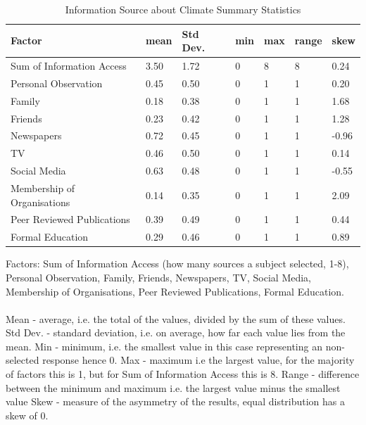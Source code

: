 \begin{center}
\begin{table}[H]
    \centering
    \begin{tabular}{|l|l|l|l|l|l|l|}
    \hline
        \textbf{Factor} & \textbf{mean} & \textbf{Std Dev}. & \textbf{ min} & \textbf{max} & \textbf{ range} & \textbf{skew}  \\ \hline
        
      Sum of Information Access & 3.50 & 1.72 & 0 & 8 & 8 & 0.24 \\ \hline
        Personal Observation  & 0.45 & 0.50 & 0 & 1 & 1 & 0.20 \\ \hline
        Family & 0.18 & 0.38 & 0 & 1 & 1 & 1.68  \\ \hline
        Friends & 0.23 & 0.42 & 0 & 1 & 1 & 1.28  \\ \hline
        Newspapers & 0.72 & 0.45 & 0 & 1 & 1 & -0.96 \\ \hline
        TV & 0.46 & 0.50 & 0 & 1 & 1 & 0.14 \\ \hline
        Social Media & 0.63 & 0.48 & 0 & 1 & 1 & -0.55 \\ \hline
        Membership of Organisations & 0.14 & 0.35 & 0 & 1 & 1 & 2.09 \\ \hline
       Peer Reviewed Publications & 0.39 & 0.49 & 0 & 1 & 1 & 0.44 \\ \hline
        Formal Education & 0.29 & 0.46 & 0 & 1 & 1 & 0.89 \\ \hline
        
         \end{tabular}
    \caption{Information Source about Climate Summary Statistics }{Factors: Sum of Information Access (how many sources a subject selected, 1-8), Personal Observation, Family, Friends, Newspapers, TV, Social Media, Membership of Organisations, Peer Reviewed Publications, Formal Education.
    \paragraph{}
    Mean - average, i.e. the total of the values, divided by the sum of these values. 
    Std Dev. - standard deviation, i.e. on average, how far each value lies from the mean.
    Min - minimum, i.e. the smallest value in this case representing an non-selected response hence 0.
    Max - maximum i.e the largest value, for the majority of factors this is 1, but for Sum of Information Access this is 8.
    Range - difference between the minimum and maximum i.e. the largest value minus the smallest value
    Skew - measure of the asymmetry of the results, equal distribution has a skew of 0.}
\label{table:sum_stats_info_climate_access}
\end{table}
\end{center}

